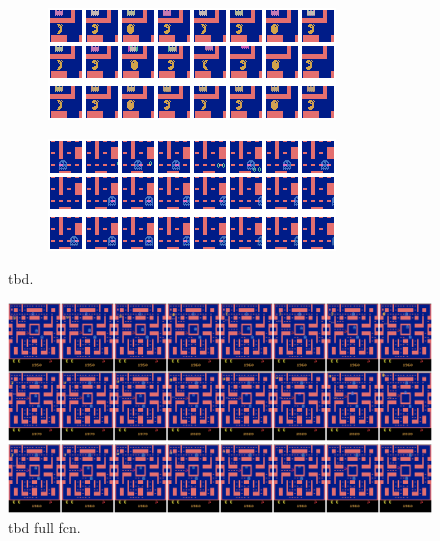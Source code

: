 \begin{figure}[h!tb]
\centering
\begin{subfigure}{0.49\textwidth}
  \centering
  \includegraphics[width=0.92\linewidth]{figures/pred/pac/random/pred-01.png}
  \caption{}
  \label{fig:pac-pred-random_extra1}
\end{subfigure}%
\begin{subfigure}{0.49\textwidth}
  \centering
  \includegraphics[width=0.92\linewidth]{figures/pred/pac/random/pred-02.png}
  \caption{}
  \label{fig:pac-pred-random_extra2}
\end{subfigure}
\caption[TBD]{tbd.} \label{fig:pac-pred-random_extra}
\end{figure}

\begin{figure}[htpb]
	\centering
	\includegraphics[width=1.0\linewidth]{figures/pred/pac/full/pred-01.png} 
	\caption[TBD]{tbd full fcn.} \label{fig:pac-pred-full2}
\end{figure}

